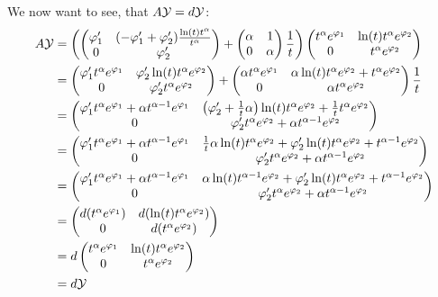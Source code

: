 We now want to see, that $A\mathcal{Y}=d\mathcal{Y}$:
\begin{align*}
  A\mathcal{Y}&=\left( \begin{pmatrix}
    \varphi_1' &
    (-\varphi_1'+\varphi_2')\frac{\ln(t)t^\alpha}{t^\alpha}
    \\0 & \varphi_2'
  \end{pmatrix} 
  +
  \begin{pmatrix} \alpha & 1 \\ 0 & \alpha \end{pmatrix} \frac{1}{t}
  \right)
  \begin{pmatrix}
    t^\alpha e^{\varphi_1} & \ln(t)t^\alpha e^{\varphi_2}
    \\0 & t^\alpha e^{\varphi_2}
  \end{pmatrix}
  \\&=\begin{pmatrix}
    \varphi_1' t^\alpha e^{\varphi_1}
    & \varphi_2'\ln(t)t^\alpha e^{\varphi_2}
    \\0 & \varphi_2' t^\alpha e^{\varphi_2}
  \end{pmatrix}
  +
  \begin{pmatrix}
    \alpha t^\alpha e^{\varphi_1} &
    \alpha\ln(t)t^\alpha e^{\varphi_2} + t^\alpha e^{\varphi_2}
    \\0 & \alpha t^\alpha e^{\varphi_2}
  \end{pmatrix}
  \frac{1}{t}
  \\&=\begin{pmatrix}
    \varphi_1' t^\alpha e^{\varphi_1} +\alpha t^{\alpha-1} e^{\varphi_1}
    &
    \left(\varphi_2'+\frac{1}{t}\alpha\right)
    \ln(t)t^\alpha e^{\varphi_2}
    +\frac{1}{t} t^\alpha e^{\varphi_2}
    \\0 & \varphi_2' t^\alpha e^{\varphi_2}+\alpha t^{\alpha-1} e^{\varphi_2}
  \end{pmatrix}
  \\&=\begin{pmatrix}
    \varphi_1' t^\alpha e^{\varphi_1} +\alpha t^{\alpha-1} e^{\varphi_1}
    &
    \frac{1}{t}\alpha\ln(t)t^\alpha e^{\varphi_2}
    +\varphi_2' \ln(t)t^\alpha e^{\varphi_2}
    +t^{\alpha-1} e^{\varphi_2}
    \\0 & \varphi_2' t^\alpha e^{\varphi_2}+\alpha t^{\alpha-1} e^{\varphi_2}
  \end{pmatrix}
  \\&=\begin{pmatrix}
    \varphi_1' t^\alpha e^{\varphi_1} +\alpha t^{\alpha-1} e^{\varphi_1}
    &
    \alpha\ln(t)t^{\alpha-1} e^{\varphi_2}
    +\varphi_2' \ln(t)t^\alpha e^{\varphi_2}
    +t^{\alpha-1} e^{\varphi_2}
    \\0 & \varphi_2' t^\alpha e^{\varphi_2}+\alpha t^{\alpha-1} e^{\varphi_2}
  \end{pmatrix}
  \\&=\begin{pmatrix}
    d(t^\alpha e^{\varphi_1}) & d(\ln(t)t^\alpha e^{\varphi_2})
    \\0 & d(t^\alpha e^{\varphi_2})
  \end{pmatrix}
  \\&=d\begin{pmatrix}
    t^\alpha e^{\varphi_1} & \ln(t)t^\alpha e^{\varphi_2}
    \\0 & t^\alpha e^{\varphi_2}
  \end{pmatrix}
  \\&=d\mathcal{Y}
\end{align*}
